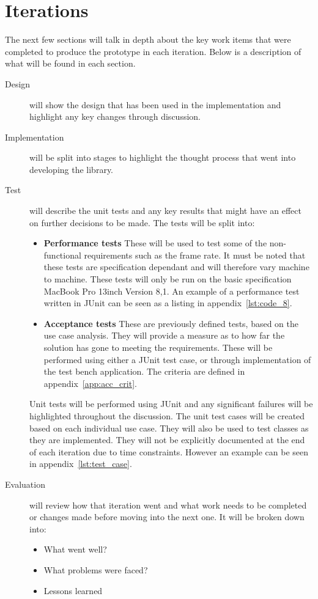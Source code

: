 \documentclass[11pt,oneside]{report}
\begin{document}
	\section{Iterations}
		The next few sections will talk in depth about the key work items that were completed to produce the prototype in each iteration.
		Below is a description of what will be found in each section.
		\begin{description}
		\item[Design] will show the design that has been used in the implementation and highlight any key changes through discussion.
		\item[Implementation] will be split into stages to highlight the thought process that went into developing the library.
		\item[Test] will describe the unit tests and any key results that might have an effect on further decisions to be made.
		The tests will be split into:
			\begin{itemize}
				\item \textbf{Performance tests} These will be used to test some of the non-functional requirements such as the frame rate. 
				It must be noted that these tests are specification dependant and will therefore vary machine to machine.
				These tests will only be run on the basic specification MacBook Pro 13inch Version 8,1.
				An example of a performance test written in JUnit can be seen as a listing in appendix~\ref{lst:code_8}.
				\item \textbf{Acceptance tests} These are previously defined tests, based on the use case analysis.
				They will provide a measure as to how far the solution has gone to meeting the requirements.
				These will be performed using either a JUnit test case, or through implementation of the test bench application.
				The criteria are defined in appendix~\ref{app:acc_crit}.
			\end{itemize}
			Unit tests will be performed using JUnit and any significant failures will be highlighted throughout the discussion.
			The unit test cases will be created based on each individual use case.
			They will also be used to test classes as they are implemented.
			They will not be explicitly documented at the end of each iteration due to time constraints.
			However an example can be seen in appendix~\ref{lst:test_case}.
		\item[Evaluation] will review how that iteration went and what work needs to be completed or changes made before moving into the next one. It will be broken down into:
			\begin{itemize}
				\item{What went well?}
				\item{What problems were faced?}
				\item{Lessons learned}	
			\end{itemize}
		\end{description}
\end{document}
